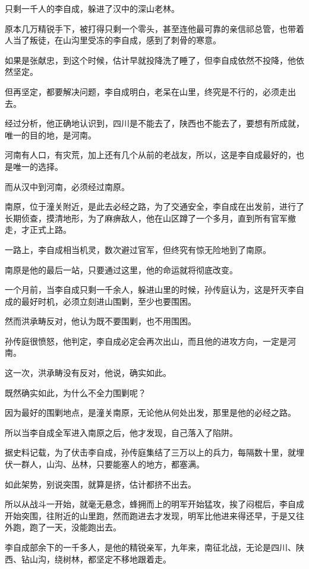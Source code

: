 \begin{multicols}{\theparacolNo}
		只剩一千人的李自成，躲进了汉中的深山老林。

		原本几万精锐手下，被打得只剩一个零头，甚至连他最可靠的亲信祁总管，也带着人当了叛徒，在山沟里受冻的李自成，感到了刺骨的寒意。

		如果是张献忠，到这个时候，估计早就投降洗了睡了，但李自成依然不投降，他依然坚定。

		但再坚定，都要解决问题，李自成明白，老呆在山里，终究是不行的，必须走出去。

		经过分析，他正确地认识到，四川是不能去了，陕西也不能去了，要想有所成就，唯一的目的地，是河南。

		河南有人口，有灾荒，加上还有几个从前的老战友，所以，这是李自成最好的，也是唯一的选择。

		而从汉中到河南，必须经过南原。

		南原，位于潼关附近，是此去必经之路，为了交通安全，李自成在出发前，进行了长期侦查，摸清地形，为了麻痹敌人，他在山区蹲了一个多月，直到所有官军撤走，才正式上路。

		一路上，李自成相当机灵，数次避过官军，但终究有惊无险地到了南原。

		南原是他的最后一站，只要通过这里，他的命运就将彻底改变。

		一个月前，当李自成只剩一千余人，躲进山里的时候，孙传庭认为，这是歼灭李自成的最好时机，必须立刻进山围剿，至少也要围困。

		然而洪承畴反对，他认为既不要围剿，也不用围困。

		孙传庭很愤怒，他判定，李自成必定会再次出山，而且他的进攻方向，一定是河南。

		这一次，洪承畴没有反对，他说，确实如此。

		既然确实如此，为什么不全力围剿呢？

		因为最好的围剿地点，是潼关南原，无论他从何处出发，那里是他的必经之路。

		所以当李自成全军进入南原之后，他才发现，自己落入了陷阱。

		据史料记载，为了伏击李自成，孙传庭集结了三万以上的兵力，每隔数十里，就埋伏一群人，山沟、丛林，只要能塞人的地方，都塞满。

		如此架势，别说突围，就算是挤，估计都挤不出去。

		所以从战斗一开始，就毫无悬念，蜂拥而上的明军开始猛攻，挨了闷棍后，李自成开始突围，往附近的山里跑，然而跑进去才发现，明军比他进来得还早，于是又往外跑，跑了一天，没能跑出去。

		李自成部余下的一千多人，是他的精锐亲军，九年来，南征北战，无论是四川、陕西、钻山沟，绕树林，都坚定不移地跟着走。


\end{multicols}
